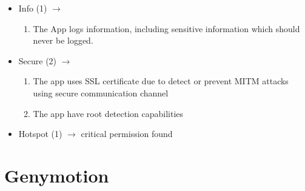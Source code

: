 \begin{itemize}
\begin{enumerate}
        \end{enumerate}
        \item Info (1) $\rightarrow$ \begin{enumerate}
            \item The App logs information, including sensitive information which should never be logged.
        \end{enumerate}
        \item Secure (2) $\rightarrow$ \begin{enumerate}
            \item The app uses SSL certificate due to detect or prevent MITM attacks using secure communication channel
            \item The app have root detection capabilities
        \end{enumerate}
        \item Hotspot (1) $\rightarrow$ critical permission found
    \end{itemize}
    \section{Genymotion}
        